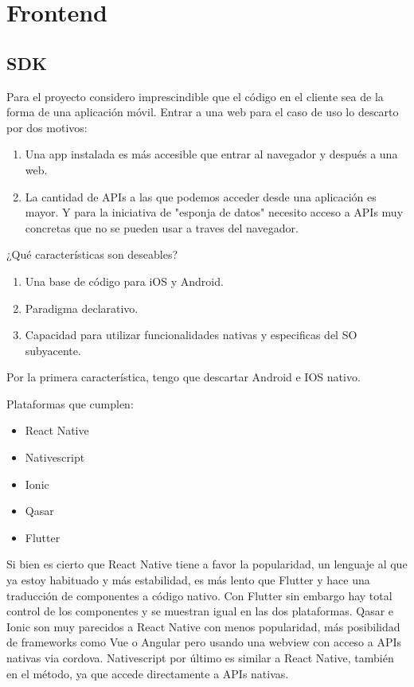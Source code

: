 \chapter{Frontend}
\section{SDK}

Para el proyecto considero imprescindible que el código en el cliente sea de la forma de una aplicación móvil. 
Entrar a una web para el caso de uso lo descarto por dos motivos:
\begin{enumerate}
  \item Una app instalada es más accesible que entrar al navegador y después a una web.
  \item La cantidad de APIs a las que podemos acceder desde una aplicación es mayor. Y para la iniciativa de "esponja de datos" necesito acceso a APIs muy concretas que no se pueden usar a traves del navegador.
\end{enumerate}

¿Qué características son deseables?

\begin{enumerate}
  \item Una base de código para iOS y Android.
  \item Paradigma declarativo.
  \item Capacidad para utilizar funcionalidades nativas y especificas del SO subyacente.
\end{enumerate}

Por la primera característica, tengo que descartar Android e IOS nativo. 

Plataformas que cumplen: 
\begin{itemize}
  \item React Native
  \item Nativescript
  \item Ionic
  \item Qasar
  \item Flutter
\end{itemize}


Si bien es cierto que React Native tiene a favor la popularidad, un lenguaje al que ya estoy habituado y más estabilidad, es más lento que Flutter y hace una traducción de componentes a código nativo.
Con Flutter sin embargo hay total control de los componentes y se muestran igual en las dos plataformas. Qasar e Ionic son muy parecidos a React Native con menos popularidad, más posibilidad de frameworks como Vue o Angular pero usando 
una webview con acceso a APIs nativas via cordova. Nativescript por último es similar a React Native, también en el método, ya que accede directamente a APIs nativas.

